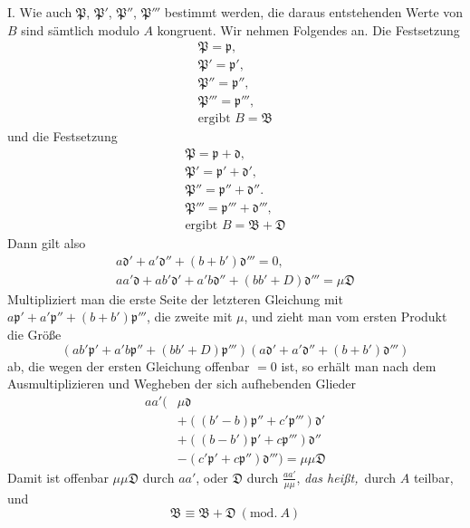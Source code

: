I. Wie auch $\mathfrak{P}$, $\mathfrak{P}'$, $\mathfrak{P}''$, $\mathfrak{P}'''$ bestimmt werden, die daraus entstehenden Werte von $B$ sind sämtlich modulo $A$ kongruent. Wir nehmen Folgendes an. Die Festsetzung
\[
\begin{gathered}\mathfrak{P}=\mathfrak{p},\\ \mathfrak{P}'=\mathfrak{p}',\\ \mathfrak{P}''=\mathfrak{p}'',\\ \mathfrak{P}'''=\mathfrak{p}''',\\\text{ergibt } B=\mathfrak{B}\end{gathered}
\]
und die Festsetzung
\[
\begin{gathered}\mathfrak{P}=\mathfrak{p}+\mathfrak{d},\\ \mathfrak{P}'=\mathfrak{p}'+\mathfrak{d}',\\ \mathfrak{P}''=\mathfrak{p}''+\mathfrak{d}''.\\ \mathfrak{P}'''=\mathfrak{p}'''+\mathfrak{d}''',\\\text{ergibt } B=\mathfrak{B}+\mathfrak{D}\end{gathered}
\]
Dann gilt also
\[
\begin{gathered}a\mathfrak{d}'+a'\mathfrak{d}''+(b+b')\mathfrak{d}'''=0,\\
aa'\mathfrak{d}+ab'\mathfrak{d}'+a'b\mathfrak{d}''+(bb'+D)\mathfrak{d}'''=\mu\mathfrak{D}\end{gathered}
\]
Multipliziert man die erste Seite der letzteren Gleichung mit $a\mathfrak{p}'+a'\mathfrak{p}''+(b+b')\mathfrak{p}'''$, die zweite mit $\mu$, und zieht man vom ersten Produkt die Größe
\[
(ab'\mathfrak{p}'+a'b\mathfrak{p}''+(bb'+D)\mathfrak{p}''')(a\mathfrak{d}'+a'\mathfrak{d}''+(b+b')\mathfrak{d}''')
\]
ab, die wegen der ersten Gleichung offenbar $=0$ ist, so erhält man nach dem Ausmultiplizieren und Wegheben der sich aufhebenden Glieder
\[
\begin{aligned}aa'(&\mu\mathfrak{d}\\&+((b'-b)\mathfrak{p}''+c'\mathfrak{p}''')\mathfrak{d}'\\&+((b-b')\mathfrak{p}'+c\mathfrak{p}''')\mathfrak{d}''\\&-(c'\mathfrak{p}'+c\mathfrak{p}'')\mathfrak{d}''')=\mu\mu\mathfrak{D}\end{aligned}
\]
Damit ist offenbar $\mu\mu\mathfrak{D}$ durch $aa'$, oder $\mathfrak{D}$ durch $\frac{aa'}{\mu\mu}$, \textit{das heißt,}\ durch $A$ teilbar, und
\[
\mathfrak{B}\equiv\mathfrak{B}+\mathfrak{D}\ (\mathrm{mod.}\ A)
\]


